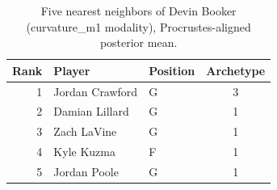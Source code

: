 \begin{table}[htbp]
  \centering\small
  \begin{tabular}{rllc}
    \toprule
    Rank & Player & Position & Archetype \\
    \midrule
    1 & Jordan Crawford & G & 3 \\
    2 & Damian Lillard & G & 1 \\
    3 & Zach LaVine & G & 1 \\
    4 & Kyle Kuzma & F & 1 \\
    5 & Jordan Poole & G & 1 \\
    \bottomrule
  \end{tabular}
  \caption{Five nearest neighbors of Devin Booker (curvature_m1 modality), Procrustes-aligned posterior mean.}
  \label{tab:Devin_Booker_neighbors_curvature_m1}
\end{table}

